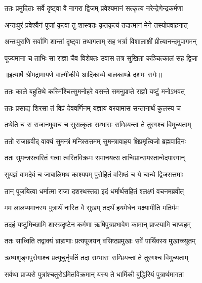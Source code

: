 \twolineshloka
{ततः प्रमुदिताः सर्वे दृष्ट्वा वै नागरा द्विजम्}
{प्रवेश्यमानं सत्कृत्य नरेन्द्रेणेन्द्रकर्मणा} %

\twolineshloka
{अन्तःपुरं प्रवेश्यैनं पूजां कृत्वा तु शास्त्रतः}
{कृतकृत्यं तदात्मानं मेने तस्योपवाहनात्} %

\twolineshloka
{अन्तःपुराणि सर्वाणि शान्तां दृष्ट्वा तथागताम्}
{सह भर्त्रा विशालाक्षीं प्रीत्यानन्दमुपागमन्} %

\twolineshloka
{पूज्यमाना च ताभिः सा राज्ञा चैव विशेषतः}
{उवास तत्र सुखिता कञ्चित्कालं सह द्विजा} %


{॥इत्यार्षे श्रीमद्रामायणे वाल्मीकीये आदिकाव्ये बालकाण्डे दशमः सर्गः॥}


\twolineshloka
{ततः काले बहुतिथे कस्मिंश्चित्सुमनोहरे}
{वसन्ते समनुप्राप्ते राज्ञो यष्टुं मनोऽभवत्} %

\twolineshloka
{ततः प्रसाद्य शिरसा तं विप्रं देववर्णिनम्}
{यज्ञाय वरयामास सन्तानार्थं कुलस्य च} %

\twolineshloka
{तथेति च स राजानमुवाच च सुसत्कृतः}
{सम्भाराः सम्भ्रियन्तां ते तुरगश्च विमुच्यताम्} %

\twolineshloka
{ततो राजाब्रवीद् वाक्यं सुमन्त्रं मन्त्रिसत्तमम्}
{सुमन्त्रावाहय क्षिप्रमृत्विजो ब्रह्मवादिनः} %

\twolineshloka
{ततः सुमन्त्रस्त्वरितं गत्वा त्वरितविक्रमः}
{समानयत्स तान्विप्रान्समस्तान्वेदपारगान्} %

\twolineshloka
{सुयज्ञं वामदेवं च जाबालिमथ काश्यपम्}
{पुरोहितं वसिष्ठं च ये चान्ये द्विजसत्तमाः} %

\twolineshloka
{तान् पूजयित्वा धर्मात्मा राजा दशरथस्तदा}
{इदं धर्मार्थसहितं श्लक्ष्णं वचनमब्रवीत्} %

\twolineshloka
{मम लालप्यमानस्य पुत्रार्थं नास्ति वै सुखम्}
{तदर्थं हयमेधेन यक्ष्यामीति मतिर्मम} %

\twolineshloka
{तदहं यष्टुमिच्छामि शास्त्रदृष्टेन कर्मणा}
{ऋषिपुत्रप्रभावेण कामान् प्राप्स्यामि चाप्यहम्} %

\twolineshloka
{ततः साध्विति तद्वाक्यं ब्राह्मणाः प्रत्यपूजयन्}
{वसिष्ठप्रमुखाः सर्वे पार्थिवस्य मुखाच्च्युतम्} %

\twolineshloka
{ऋष्यशृङ्गपुरोगाश्च प्रत्यूचुर्नृपतिं तदा}
{सम्भाराः सम्भ्रियन्तां ते तुरगश्च विमुच्यताम्} %

\twolineshloka
{सर्वथा प्राप्यसे पुत्रांश्चतुरोऽमितविक्रमान्}
{यस्य ते धार्मिकी बुद्धिरियं पुत्रार्थमागता} %

